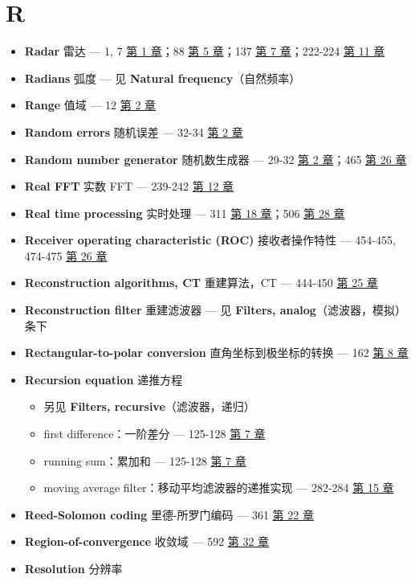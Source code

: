 \section{R}

\begin{itemize}
\tightlist
\item
  \textbf{Radar} 雷达 --- 1, 7  \hyperref[ch-01]{第 1 章}；88
   \hyperref[ch-05]{第 5 章}；137 
  \hyperref[ch-07]{第 7 章}；222-224  \hyperref[ch-11]{第 11
  章}
\item
  \textbf{Radians} 弧度 --- 见 \textbf{Natural frequency}（自然频率）
\item
  \textbf{Range} 值域 --- 12  \hyperref[ch-02]{第 2 章}
\item
  \textbf{Random errors} 随机误差 --- 32-34 
  \hyperref[ch-02]{第 2 章}
\item
  \textbf{Random number generator} 随机数生成器 --- 29-32 
  \hyperref[ch-02]{第 2 章}；465  \hyperref[ch-26]{第 26 章}
\item
  \textbf{Real FFT} 实数 FFT --- 239-242  \hyperref[ch-12]{第
  12 章}
\item
  \textbf{Real time processing} 实时处理 --- 311 
  \hyperref[ch-18]{第 18 章}；506  \hyperref[ch-28]{第 28 章}
\item
  \textbf{Receiver operating characteristic (ROC)} 接收者操作特性 ---
  454-455, 474-475  \hyperref[ch-26]{第 26 章}
\item
  \textbf{Reconstruction algorithms, CT} 重建算法，CT --- 444-450
   \hyperref[ch-25]{第 25 章}
\item
  \textbf{Reconstruction filter} 重建滤波器 --- 见 \textbf{Filters,
  analog}（滤波器，模拟）条下
\item
  \textbf{Rectangular-to-polar conversion} 直角坐标到极坐标的转换 ---
  162  \hyperref[ch-08]{第 8 章}
\item
  \textbf{Recursion equation} 递推方程

  \begin{itemize}
  \tightlist
  \item
    另见 \textbf{Filters, recursive}（滤波器，递归）
  \item
    first difference：一阶差分 --- 125-128 
    \hyperref[ch-07]{第 7 章}
  \item
    running sum：累加和 --- 125-128  \hyperref[ch-07]{第 7 章}
  \item
    moving average filter：移动平均滤波器的递推实现 --- 282-284
     \hyperref[ch-15]{第 15 章}
  \end{itemize}
\item
  \textbf{Reed-Solomon coding} 里德-所罗门编码 --- 361 
  \hyperref[ch-22]{第 22 章}
\item
  \textbf{Region-of-convergence} 收敛域 --- 592 
  \hyperref[ch-32]{第 32 章}
\item
  \textbf{Resolution} 分辨率


\end{itemize}
